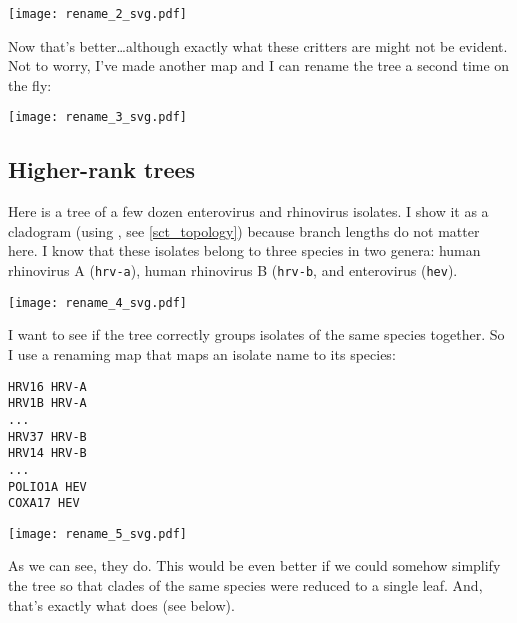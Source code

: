 
\begin{center}
\texttt{[image: rename\_2\_svg.pdf]}
\end{center}

\noindent{}Now that's better\ldots although exactly what these critters are
might not be evident. Not to worry, I've made another map and I can rename the
tree a second time on the fly:


\begin{center}
\texttt{[image: rename\_3\_svg.pdf]}
\end{center}

\subsection{Higher-rank trees}
\label{sct_higher_rank}

Here is a tree of a few dozen enterovirus and rhinovirus isolates. I show it as
a cladogram (using \topology, see \ref{sct_topology}) because branch lengths do
not matter here. I know that these isolates belong to three species in two
genera: human rhinovirus A (\texttt{hrv-a}), human rhinovirus B
(\texttt{hrv-b}, and enterovirus (\texttt{hev}). 


\begin{center}
\texttt{[image: rename\_4\_svg.pdf]}
\end{center}

\noindent{}I want to see if the tree correctly groups isolates of the same
species together. So I use a renaming map that maps an isolate name to its
species:
\begin{verbatim}
HRV16 HRV-A
HRV1B HRV-A
...
HRV37 HRV-B
HRV14 HRV-B
...
POLIO1A HEV
COXA17 HEV
\end{verbatim}


\begin{center}
\texttt{[image: rename\_5\_svg.pdf]}
\end{center}

\noindent{}As we can see, they do. This would be even better if we could
somehow simplify the tree so that clades of the same species were reduced to a
single leaf. And, that's exactly what \condense{} does (see below).
